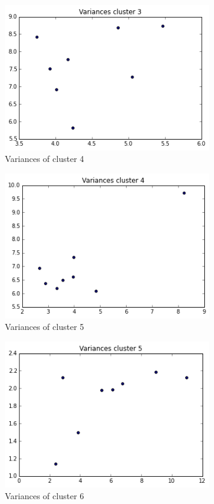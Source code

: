 \documentclass[paper=a4, fontsize=11pt]{scrartcl} %
\numberwithin{equation}{section} %
\numberwithin{figure}{section} %
\numberwithin{table}{section} %
\begin{document}
\begin{figure}[ht]
	\centering
  \includegraphics[width=0.8\textwidth]{variance_c4.png}
	\caption{Variances of cluster 4}
	\label{figv4}
\end{figure}

\begin{figure}[ht]
	\centering
  \includegraphics[width=0.8\textwidth]{variance_c5.png}
	\caption{Variances of cluster 5}
	\label{figv5}
\end{figure}

\begin{figure}[ht]
	\centering
  \includegraphics[width=0.8\textwidth]{variance_c6.png}
	\caption{Variances of cluster 6}
	\label{figv6}
\end{figure}
\end{document}
